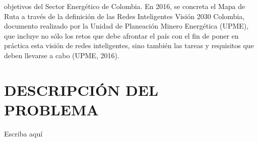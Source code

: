 \documentclass[12pt,letterpaper]{article}
\begin{document}
objetivos del Sector Energético de Colombia. \cite{2554} 
En 2016, se concreta el Mapa de Ruta a través de la definición de las Redes Inteligentes Visión 2030 Colombia, documento realizado por la Unidad de Planeación Minero Energética (UPME), que incluye no sólo los retos que debe afrontar el país con el fin de poner en práctica esta visión de redes inteligentes, sino también las tareas y requisitos que deben llevarse a cabo (UPME, 2016). \cite{ColombiaInteligente2016a} \cite{DepartamentoNacionaldePlaneacion2017}\cite{ColombiaInteligente2016}\cite{UPME2016}
\section{DESCRIPCIÓN DEL PROBLEMA}


Escriba aquí
\end{document}
